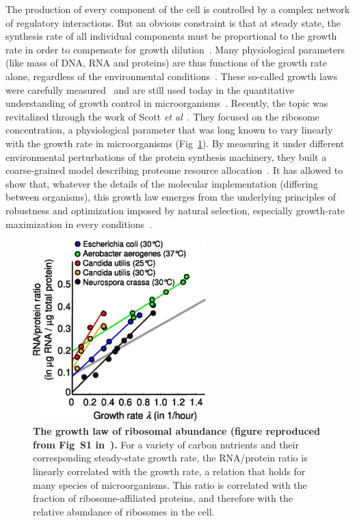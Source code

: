 The production of every component of the cell is controlled by a complex network of regulatory interactions.
But an obvious constraint is that at steady state, the synthesis rate of all individual components must be proportional to the growth rate in order to compensate for growth dilution~\cite{monod_growth_1949}.
Many physiological parameters (like mass of DNA, RNA and proteins) are thus functions of the growth rate alone, regardless of the environmental conditions~\cite{schaechter_dependency_1958,bremer_modulation_1996}.
These so-called growth laws were carefully measured~\cite{bremer_modulation_1996} and are still used today in the quantitative understanding of growth control in microorganisms~\cite{ehrenberg_mediumdependent_2012}.
Recently, the topic was revitalized through the work of Scott \textit{et al}~\cite{scott_bacterial_2011}.
They focused on the ribosome concentration, a physiological parameter that was long known to vary linearly with the growth rate in microorganisms (Fig~\ref{fig:scott_rnaprot}).
By measuring it under different environmental perturbations of the protein synthesis machinery, they built a coarse-grained model describing proteome resource allocation~\cite{scott_emergence_2014}.
It has allowed to show that, whatever the details of the molecular implementation (differing between organisms), this growth law emerges from the underlying principles of robustness and optimization imposed by natural selection, especially growth-rate maximization in every conditions~\cite{scott_emergence_2014}.

\begin{figure}[tb]
\centering
\includegraphics[height=7cm]{./Fig/Chapter1/scott_rnaprot.eps}
\caption{
\textbf{The growth law of ribosomal abundance (figure reproduced from Fig~S1 in~\cite{scott_interdependence_2010}).}
For a variety of carbon nutrients and their corresponding steady-state growth rate, the RNA/protein ratio is linearly correlated with the growth rate, a relation that holds for many species of microorganisms.
This ratio is correlated with the fraction of ribosome-affiliated proteins, and therefore with the relative abundance of ribosomes in the cell.
}
\label{fig:scott_rnaprot}
\end{figure}

